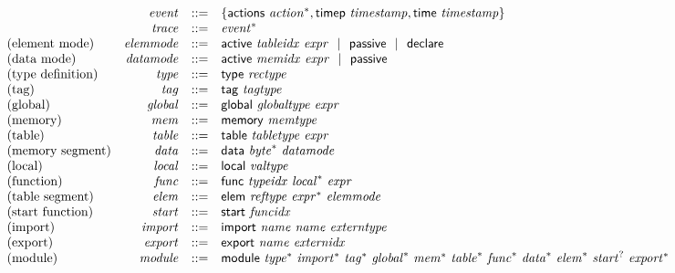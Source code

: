 \vspace{1ex}

$$
\begin{array}[t]{@{}lrrl@{}l@{}}
& {\mathit{event}} & ::= & \{ \begin{array}[t]{@{}l@{}l@{}}
\mathsf{actions}~{{\mathit{action}}^\ast} ,  \mathsf{timep}~{\mathit{timestamp}} ,  \mathsf{time}~{\mathit{timestamp}} \} \\
\end{array} \\
& {\mathit{trace}} & ::= & {{\mathit{event}}^\ast} \\
\mbox{(element mode)} & {\mathit{elemmode}} & ::= & \mathsf{active}~{\mathit{tableidx}}~{\mathit{expr}} ~~|~~ \mathsf{passive} ~~|~~ \mathsf{declare} \\
\mbox{(data mode)} & {\mathit{datamode}} & ::= & \mathsf{active}~{\mathit{memidx}}~{\mathit{expr}} ~~|~~ \mathsf{passive} \\
\mbox{(type definition)} & {\mathit{type}} & ::= & \mathsf{type}~{\mathit{rectype}} \\
\mbox{(tag)} & {\mathit{tag}} & ::= & \mathsf{tag}~{\mathit{tagtype}} \\
\mbox{(global)} & {\mathit{global}} & ::= & \mathsf{global}~{\mathit{globaltype}}~{\mathit{expr}} \\
\mbox{(memory)} & {\mathit{mem}} & ::= & \mathsf{memory}~{\mathit{memtype}} \\
\mbox{(table)} & {\mathit{table}} & ::= & \mathsf{table}~{\mathit{tabletype}}~{\mathit{expr}} \\
\mbox{(memory segment)} & {\mathit{data}} & ::= & \mathsf{data}~{{\mathit{byte}}^\ast}~{\mathit{datamode}} \\
\mbox{(local)} & {\mathit{local}} & ::= & \mathsf{local}~{\mathit{valtype}} \\
\mbox{(function)} & {\mathit{func}} & ::= & \mathsf{func}~{\mathit{typeidx}}~{{\mathit{local}}^\ast}~{\mathit{expr}} \\
\mbox{(table segment)} & {\mathit{elem}} & ::= & \mathsf{elem}~{\mathit{reftype}}~{{\mathit{expr}}^\ast}~{\mathit{elemmode}} \\
\mbox{(start function)} & {\mathit{start}} & ::= & \mathsf{start}~{\mathit{funcidx}} \\
\mbox{(import)} & {\mathit{import}} & ::= & \mathsf{import}~{\mathit{name}}~{\mathit{name}}~{\mathit{externtype}} \\
\mbox{(export)} & {\mathit{export}} & ::= & \mathsf{export}~{\mathit{name}}~{\mathit{externidx}} \\
\mbox{(module)} & {\mathit{module}} & ::= & \mathsf{module}~{{\mathit{type}}^\ast}~{{\mathit{import}}^\ast}~{{\mathit{tag}}^\ast}~{{\mathit{global}}^\ast}~{{\mathit{mem}}^\ast}~{{\mathit{table}}^\ast}~{{\mathit{func}}^\ast}~{{\mathit{data}}^\ast}~{{\mathit{elem}}^\ast}~{{\mathit{start}}^?}~{{\mathit{export}}^\ast} \\
\end{array}
$$

